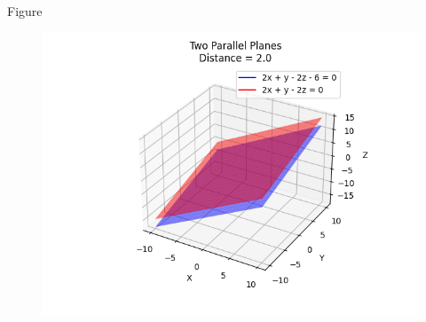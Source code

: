 \documentclass{beamer}
\begin{document}
\begin{frame}{Figure}
\begin{figure}[h!]
    \centering
    \includegraphics[height=0.5\textheight, keepaspectratio]{figs/Figure_1.png}
\end{figure}
\end{frame}
\end{document}
